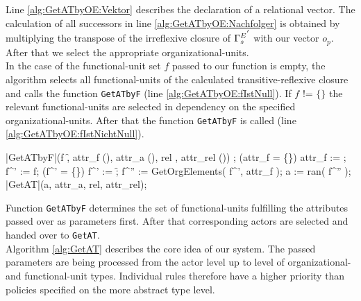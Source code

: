 \noindent Line \ref{alg:GetATbyOE:Vektor} describes the declaration of a relational vector. The calculation of all successors in line \ref{alg:GetATbyOE:Nachfolger} is obtained by multiplying the transpose of the irreflexive closure of ${\relstrukturOE_F}^{'}$ with our vector $o_{p}$. After that we select the appropriate organizational-units.\\

In the case of the functional-unit set $f$ passed to our function is empty, the algorithm selects all functional-units of the calculated transitive-reflexive closure and calls the function {\tt GetATbyF} (line \ref{alg:GetATbyOE:fIstNull}). If $f$ != $\{\}$ the relevant functional-units are selected in dependency on the specified organizational-units. After that the function {\tt GetATbyF} is called	(line \ref{alg:GetATbyOE:fIstNichtNull}). 

	\begin{samepage}
	{\small
	\NumberProgramstrue
	\begin{algorithm}[GetATbyF]\label{alg:GetATbyF}
	\begin{program}
	\FUNCT |GetATbyF|(f \subset \f, attr_f \subset (\Bezeichner \times \WerteMenge), attr_a \subset (\Bezeichner \times \WerteMenge), 
	rel \in \relname, attr_{rel} \subset (\Bezeichner \times \WerteMenge)) \subset \a 
	\BEGIN
	\var {};
	\IF (attr_f = \{\}) 
	\THEN attr_f := \attribute; 
	\FI
	f^{'} := f;
	\IF (f^{'} = \{\}) 
	\THEN f^{'} := \f; 
	\FI
	f^{''} := GetOrgElements( f^{'}, attr_f ); 
	a := ran( f^{''} \lhd \relstrukturFA );
	\RETURN \quad |GetAT|(a, attr_a, rel, attr_{rel});
	\END
	\end{program}
	\end{algorithm}
	\NumberProgramsfalse
	}
	\end{samepage}

\noindent Function {\tt GetATbyF} determines the set of functional-units fulfilling the attributes passed over as parameters first. After that corresponding actors are selected and handed over to {\tt GetAT}.\\

Algorithm \ref{alg:GetAT} describes the core idea of our system. The passed parameters are being processed from the actor level up to level of organizational- and functional-unit types. Individual rules therefore have a higher priority than policies specified on the more abstract type level.
	
